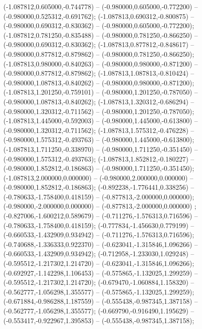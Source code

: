  (-1.087812,0.605000,-0.744778) -- (-0.980000,0.605000,-0.772200) -- (-0.980000,0.525312,-0.691762);
 (-1.087813,0.690312,-0.800875) -- (-0.980000,0.690312,-0.830362) -- (-0.980000,0.605000,-0.772200);
 (-1.087812,0.781250,-0.835488) -- (-0.980000,0.781250,-0.866250) -- (-0.980000,0.690312,-0.830362);
 (-1.087813,0.877812,-0.848617) -- (-0.980000,0.877812,-0.879862) -- (-0.980000,0.781250,-0.866250);
 (-1.087813,0.980000,-0.840263) -- (-0.980000,0.980000,-0.871200) -- (-0.980000,0.877812,-0.879862);
 (-1.087813,1.087813,-0.810424) -- (-0.980000,1.087813,-0.840262) -- (-0.980000,0.980000,-0.871200);
 (-1.087813,1.201250,-0.759101) -- (-0.980000,1.201250,-0.787050) -- (-0.980000,1.087813,-0.840262);
 (-1.087813,1.320312,-0.686294) -- (-0.980000,1.320312,-0.711562) -- (-0.980000,1.201250,-0.787050);
 (-1.087813,1.445000,-0.592003) -- (-0.980000,1.445000,-0.613800) -- (-0.980000,1.320312,-0.711562);
 (-1.087813,1.575312,-0.476228) -- (-0.980000,1.575312,-0.493763) -- (-0.980000,1.445000,-0.613800);
 (-1.087813,1.711250,-0.338970) -- (-0.980000,1.711250,-0.351450) -- (-0.980000,1.575312,-0.493763);
 (-1.087813,1.852812,-0.180227) -- (-0.980000,1.852812,-0.186863) -- (-0.980000,1.711250,-0.351450);
 (-1.087813,2.000000,0.000000) -- (-0.980000,2.000000,0.000000) -- (-0.980000,1.852812,-0.186863);
 (-0.892238,-1.776441,0.338256) -- (-0.780633,-1.758400,0.418159) -- (-0.877813,-2.000000,0.000000);
 (-0.980000,-2.000000,0.000000) -- (-0.877813,-2.000000,0.000000) ;
 (-0.827006,-1.600212,0.589679) -- (-0.711276,-1.576313,0.716596) -- (-0.780633,-1.758400,0.418159);
 (-0.777834,-1.456630,0.779199) -- (-0.660533,-1.432909,0.934942) -- (-0.711276,-1.576313,0.716596);
 (-0.740688,-1.336333,0.922370) -- (-0.623041,-1.315846,1.096266) -- (-0.660533,-1.432909,0.934942);
 (-0.712958,-1.233030,1.029248) -- (-0.595512,-1.217302,1.214720) -- (-0.623041,-1.315846,1.096266);
 (-0.692927,-1.142298,1.106453) -- (-0.575865,-1.132025,1.299259) -- (-0.595512,-1.217302,1.214720);
 (-0.679470,-1.060884,1.158320) -- (-0.562777,-1.056298,1.355577) -- (-0.575865,-1.132025,1.299259);
 (-0.671884,-0.986288,1.187559) -- (-0.555438,-0.987345,1.387158) -- (-0.562777,-1.056298,1.355577);
 (-0.669790,-0.916490,1.195629) -- (-0.553417,-0.922967,1.395853) -- (-0.555438,-0.987345,1.387158);
